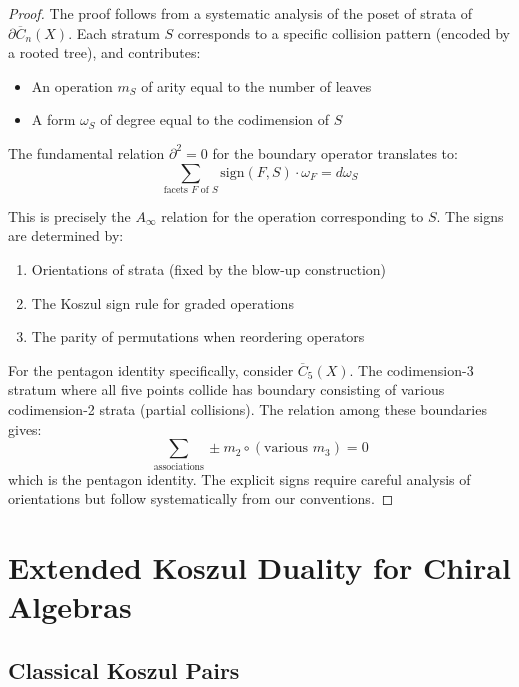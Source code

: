 \begin{proof}
The proof follows from a systematic analysis of the poset of strata of $\partial\overline{C}_n(X)$. 
Each stratum $S$ corresponds to a specific collision pattern (encoded by a rooted tree), and contributes:
\begin{itemize}
\item An operation $m_S$ of arity equal to the number of leaves
\item A form $\omega_S$ of degree equal to the codimension of $S$
\end{itemize}
 
The fundamental relation $\partial^2 = 0$ for the boundary operator translates to:
\[
\sum_{\text{facets } F \text{ of } S} \text{sign}(F,S) \cdot \omega_F = d\omega_S
\]
 
This is precisely the $A_\infty$ relation for the operation corresponding to $S$. The signs are 
determined by:
\begin{enumerate}
\item Orientations of strata (fixed by the blow-up construction)
\item The Koszul sign rule for graded operations
\item The parity of permutations when reordering operators
\end{enumerate}
 
For the pentagon identity specifically, consider $\overline{C}_5(X)$. The codimension-3 stratum where all 
five points collide has boundary consisting of various codimension-2 strata (partial collisions). The 
relation among these boundaries gives:
\[
\sum_{\text{associations}} \pm m_2 \circ (\text{various } m_3) = 0
\]
which is the pentagon identity. The explicit signs require careful analysis of orientations but follow 
systematically from our conventions.
\end{proof}
 
\section{Extended Koszul Duality for Chiral Algebras}
 
\subsection{Classical Koszul Pairs}


